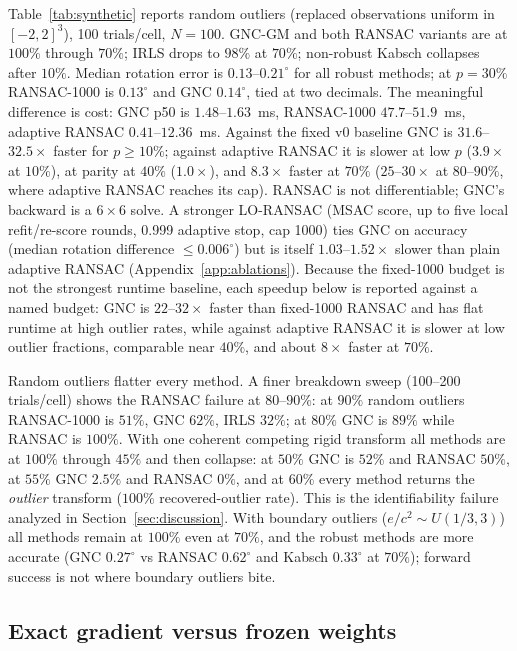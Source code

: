Table~\ref{tab:synthetic} reports random outliers (replaced observations uniform in $[-2,2]^3$),
100 trials/cell, $N=100$. GNC-GM and both RANSAC variants are at $100\%$ through $70\%$; IRLS drops
to $98\%$ at $70\%$; non-robust Kabsch collapses after $10\%$. Median rotation error is
$0.13$--$0.21^\circ$ for all robust methods; at $p=30\%$ RANSAC-1000 is $0.13^\circ$ and GNC
$0.14^\circ$, tied at two decimals. The meaningful difference is cost: GNC p50 is
$1.48$--$1.63$~ms, RANSAC-1000 $47.7$--$51.9$~ms, adaptive RANSAC $0.41$--$12.36$~ms. Against the
fixed v0 baseline GNC is $\mathbf{31.6}$--$\mathbf{32.5\times}$ faster for $p\ge10\%$; against
adaptive RANSAC it is slower at low $p$ ($3.9\times$ at $10\%$), at parity at $40\%$ ($1.0\times$),
and $8.3\times$ faster at $70\%$ ($25$--$30\times$ at $80$--$90\%$, where adaptive RANSAC reaches
its cap). RANSAC is not differentiable; GNC's backward is a $6\times6$ solve. A stronger LO-RANSAC
(MSAC score, up to five local refit/re-score rounds, 0.999 adaptive stop, cap 1000) ties GNC on
accuracy (median rotation difference $\le0.006^\circ$) but is itself $1.03$--$1.52\times$ slower
than plain adaptive RANSAC (Appendix~\ref{app:ablations}). Because the fixed-1000 budget is not the
strongest runtime baseline, each speedup below is reported against a named budget: GNC is
$22$--$32\times$ faster than fixed-1000 RANSAC and has flat runtime at high outlier rates, while
against adaptive RANSAC it is slower at low outlier fractions, comparable near $40\%$, and about
$8\times$ faster at $70\%$.

Random outliers flatter every method. A finer breakdown sweep (100--200 trials/cell) shows the
RANSAC failure at $80$--$90\%$: at $90\%$ random outliers RANSAC-1000 is $51\%$, GNC $62\%$, IRLS
$32\%$; at $80\%$ GNC is $89\%$ while RANSAC is $100\%$. With one coherent competing rigid
transform all methods are at $100\%$ through $45\%$ and then collapse: at $50\%$ GNC is $52\%$ and
RANSAC $50\%$, at $55\%$ GNC $2.5\%$ and RANSAC $0\%$, and at $60\%$ every method returns the
\emph{outlier} transform ($100\%$ recovered-outlier rate). This is the identifiability failure
analyzed in Section~\ref{sec:discussion}. With boundary outliers ($e/c^2\sim U(1/3,3)$) all
methods remain at $100\%$ even at $70\%$, and the robust methods are more accurate (GNC
$0.27^\circ$ vs RANSAC $0.62^\circ$ and Kabsch $0.33^\circ$ at $70\%$); forward success is not
where boundary outliers bite.

\subsection{Exact gradient versus frozen weights}
\label{sec:gradient}

